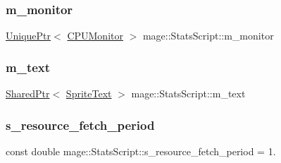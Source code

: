 \subsubsection{\texorpdfstring{m\+\_\+monitor}{m\_monitor}}
{\footnotesize\ttfamily \hyperlink{namespacemage_a3316d7143a973e37adf1110f2e80ca31}{Unique\+Ptr}$<$ \hyperlink{classmage_1_1_c_p_u_monitor}{C\+P\+U\+Monitor} $>$ mage\+::\+Stats\+Script\+::m\+\_\+monitor\hspace{0.3cm}{\ttfamily [private]}}

\hypertarget{classmage_1_1_stats_script_a35bb45baabf290be684c8b67f30feeb7}{}\label{classmage_1_1_stats_script_a35bb45baabf290be684c8b67f30feeb7} 
\subsubsection{\texorpdfstring{m\+\_\+text}{m\_text}}
{\footnotesize\ttfamily \hyperlink{namespacemage_a1e01ae66713838a7a67d30e44c67703e}{Shared\+Ptr}$<$ \hyperlink{classmage_1_1_sprite_text}{Sprite\+Text} $>$ mage\+::\+Stats\+Script\+::m\+\_\+text\hspace{0.3cm}{\ttfamily [private]}}

\hypertarget{classmage_1_1_stats_script_a3601b2c67bfa911d98187857b05c17ab}{}\label{classmage_1_1_stats_script_a3601b2c67bfa911d98187857b05c17ab} 
\subsubsection{\texorpdfstring{s\+\_\+resource\+\_\+fetch\+\_\+period}{s\_resource\_fetch\_period}}
{\footnotesize\ttfamily const double mage\+::\+Stats\+Script\+::s\+\_\+resource\+\_\+fetch\+\_\+period = 1.\hspace{0.3cm}{\ttfamily [static]}}

